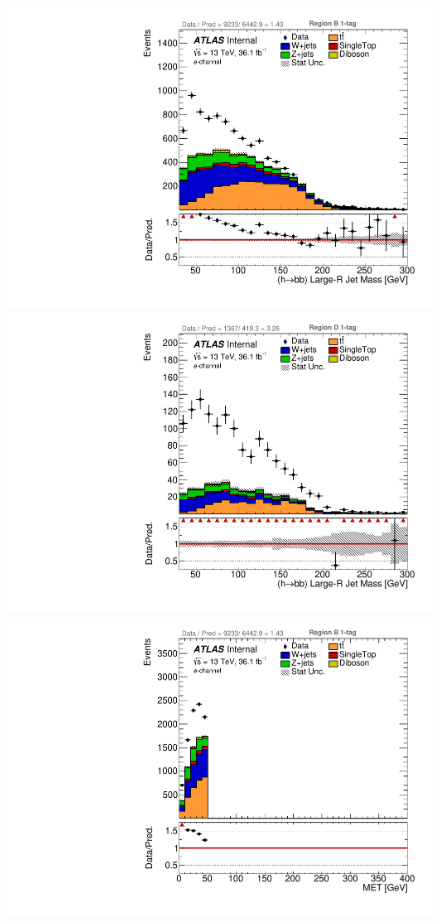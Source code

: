 \begin{figure}[!htbp]
\begin{center}
\includegraphics[scale=0.33]{./figures/boosted/ABCD_1tag0bjet/elec_Inc_RegionB_HbbMass}
\includegraphics[scale=0.33]{./figures/boosted/ABCD_1tag0bjet/elec_Inc_RegionD_HbbMass}\\
\includegraphics[scale=0.33]{./figures/boosted/ABCD_1tag0bjet/elec_Inc_RegionB_MET}  

\end{center}
\end{figure}

